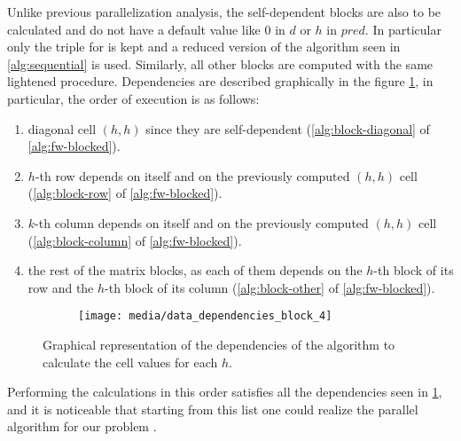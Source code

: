 Unlike previous parallelization analysis, the self-dependent blocks are also to be calculated and do not have a default value like \(0\) in \(d\) or \(h\) in \(pred\). 
In particular only the triple for is kept and a reduced version of the algorithm seen in \cref{alg:sequential} is used.
Similarly, all other blocks are computed with the same lightened procedure. Dependencies are described graphically in the figure \cref{fig:data-dependency-external-loop-parallel}, in particular, the order of execution is as follows:

\begin{enumerate}
    \item diagonal cell \((h,h)\) since they are self-dependent (\cref{alg:block-diagonal} of \cref{alg:fw-blocked}).
    \item \(h\)-th row depends on itself and on the previously computed  \((h,h)\) cell (\cref{alg:block-row}  of \cref{alg:fw-blocked}).
    \item \(k\)-th column depends on itself and on the previously computed  \((h,h)\) cell (\cref{alg:block-column}  of \cref{alg:fw-blocked}).
    \item the rest of the matrix blocks, as each of them depends on the \(h\)-th block of its row and the \(h\)-th block of its column (\cref{alg:block-other}  of \cref{alg:fw-blocked}).
\end{enumerate}


\begin{figure}[htbp]
    \centering
    \begin{subfigure}[t]{0.8\textwidth}
        \centering
        \texttt{[image: media/data\_dependencies\_block\_4]}
    \end{subfigure}

    \caption{Graphical representation of the dependencies of the algorithm to calculate the cell values for each \(h\).}
    \label{fig:data-dependency-external-loop-parallel}
\end{figure}

Performing the calculations in this order satisfies all the dependencies seen in \cref{fig:data-dependency-external-loop-parallel}, and it is noticeable that starting from this list one could realize the parallel algorithm for our problem \cite{rucci}.

